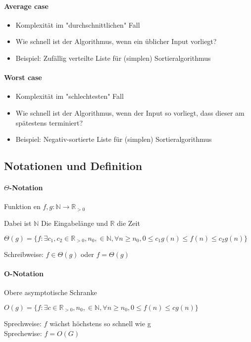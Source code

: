 	\paragraph{Average case}
	\begin{itemize}
		\item Komplexität im "durchschnittlichen" Fall
		\item Wie schnell ist der Algorithmus, wenn ein üblicher Input vorliegt?
		\item Beispiel: Zufällig verteilte Liste für (simplen) Sortieralgorithmus
	\end{itemize}
	\paragraph{Worst case}
	\begin{itemize}
		\item Komplexität im "schlechtesten" Fall
		\item Wie schnell ist der Algorithmus, wenn der Input so vorliegt, dass dieser am spätestens terminiert?
		\item Beispiel: Negativ-sortierte Liste für (simplen) Sortieralgorithmus
	\end{itemize}

	\subsection{Notationen und Definition}
	\paragraph{$\Theta$-Notation}
	\begin{center}
		Funktion en $f, g: \mathbb{N} \rightarrow \mathbb{R}_{>0}$ \\
	\end{center}
	Dabei ist $\mathbb{N}$ Die Eingabelänge und $\mathbb{R}$ die Zeit 
	\begin{center}
		$\Theta(g) = \{f: \exists c_1 , c_2 \in \mathbb{R}_{>0}, n_0 , \in \mathbb{N}, \forall n \geq n_0 , 0 \leq c_1 g(n) \leq f(n) \leq c_2 g(n)\}$
	\end{center}
	Schreibweise: $f \in \Theta (g)$ oder $f = \Theta (g)$

	\paragraph{O-Notation}
	Obere asymptotische Schranke
	\begin{center}
		$O(g) = \{f: \exists c \in \mathbb{R}_{>0}, n_0 , \in \mathbb{N}, \forall n \geq n_0 , 0 \leq f(n) \leq c g(n)\}$
	\end{center}
	Sprechweise: $f$ wächst höchstens so schnell wie g \\
	Sprechewise: $f = O(G)$ \\\\

